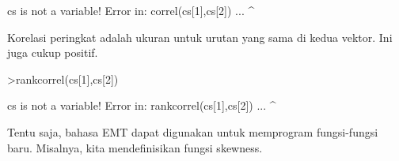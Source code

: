 \documentclass[a4paper,10pt]{article}
\begin{document}
\begin{eulernotebook}
\begin{eulercomment}
\begin{eulercomment}
\begin{eulercomment}
\begin{eulercomment}
\begin{eulercomment}
\begin{eulercomment}
\begin{eulercomment}
\begin{eulercomment}
\begin{eulercomment}
\begin{eulercomment}
\begin{eulercomment}
\begin{eulercomment}
\begin{eulercomment}
\begin{eulercomment}
\begin{eulercomment}
\begin{eulercomment}
\begin{eulercomment}
\begin{eulercomment}
\begin{euleroutput}
  cs is not a variable!
  Error in:
  correl(cs[1],cs[2]) ...
              ^
\end{euleroutput}
\begin{eulercomment}
Korelasi peringkat adalah ukuran untuk urutan yang sama di kedua
vektor. Ini juga cukup positif.
\end{eulercomment}
\begin{eulerprompt}
>rankcorrel(cs[1],cs[2])
\end{eulerprompt}
\begin{euleroutput}
  cs is not a variable!
  Error in:
  rankcorrel(cs[1],cs[2]) ...
                  ^
\end{euleroutput}
\begin{eulercomment}
Tentu saja, bahasa EMT dapat digunakan untuk memprogram fungsi-fungsi
baru. Misalnya, kita mendefinisikan fungsi skewness.


\end{eulercomment}
\end{eulercomment}
\end{eulercomment}
\end{eulercomment}
\end{eulercomment}
\end{eulercomment}
\end{eulercomment}
\end{eulercomment}
\end{eulercomment}
\end{eulercomment}
\end{eulercomment}
\end{eulercomment}
\end{eulercomment}
\end{eulercomment}
\end{eulercomment}
\end{eulercomment}
\end{eulercomment}
\end{eulercomment}
\end{eulercomment}
\end{eulernotebook}
\end{document}
